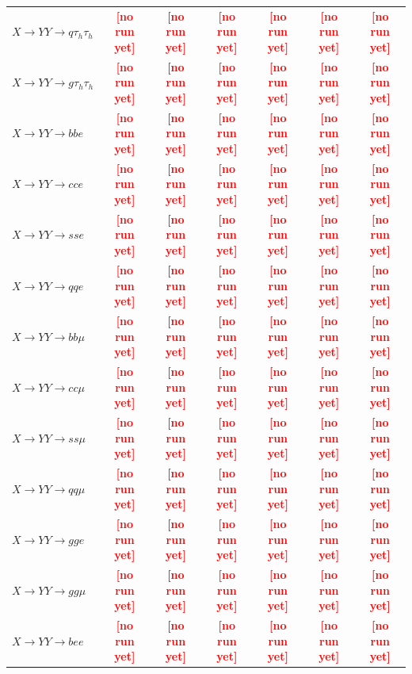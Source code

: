 \documentclass[12pt]{article}   %
\newcommand{\pending}[1]{\textcolor{red}{\textbf{[#1]}}}
\begin{document}
\begin{landscape}
{\begin{longtable}{@{\extracolsep{\fill}}lcccccc@{}}
$X\to YY\to q\tau_h\tau_h$ & \pending{no run yet} & \pending{no run yet} & \pending{no run yet} & \pending{no run yet} & \pending{no run yet} & \pending{no run yet} \\
$X\to YY\to g\tau_h\tau_h$ & \pending{no run yet} & \pending{no run yet} & \pending{no run yet} & \pending{no run yet} & \pending{no run yet} & \pending{no run yet} \\
\midrule
$X\to YY\to bbe$ & \pending{no run yet} & \pending{no run yet} & \pending{no run yet} & \pending{no run yet} & \pending{no run yet} & \pending{no run yet} \\
$X\to YY\to cce$ & \pending{no run yet} & \pending{no run yet} & \pending{no run yet} & \pending{no run yet} & \pending{no run yet} & \pending{no run yet} \\
$X\to YY\to sse$ & \pending{no run yet} & \pending{no run yet} & \pending{no run yet} & \pending{no run yet} & \pending{no run yet} & \pending{no run yet} \\
$X\to YY\to qqe$ & \pending{no run yet} & \pending{no run yet} & \pending{no run yet} & \pending{no run yet} & \pending{no run yet} & \pending{no run yet} \\
$X\to YY\to bb\mu$ & \pending{no run yet} & \pending{no run yet} & \pending{no run yet} & \pending{no run yet} & \pending{no run yet} & \pending{no run yet} \\
$X\to YY\to cc\mu$ & \pending{no run yet} & \pending{no run yet} & \pending{no run yet} & \pending{no run yet} & \pending{no run yet} & \pending{no run yet} \\
$X\to YY\to ss\mu$ & \pending{no run yet} & \pending{no run yet} & \pending{no run yet} & \pending{no run yet} & \pending{no run yet} & \pending{no run yet} \\
$X\to YY\to qq\mu$ & \pending{no run yet} & \pending{no run yet} & \pending{no run yet} & \pending{no run yet} & \pending{no run yet} & \pending{no run yet} \\
$X\to YY\to gge$ & \pending{no run yet} & \pending{no run yet} & \pending{no run yet} & \pending{no run yet} & \pending{no run yet} & \pending{no run yet} \\
$X\to YY\to gg\mu$ & \pending{no run yet} & \pending{no run yet} & \pending{no run yet} & \pending{no run yet} & \pending{no run yet} & \pending{no run yet} \\
\midrule
$X\to YY\to bee$ & \pending{no run yet} & \pending{no run yet} & \pending{no run yet} & \pending{no run yet} & \pending{no run yet} & \pending{no run yet} \\

\end{longtable}}
\end{landscape}
\end{document}
